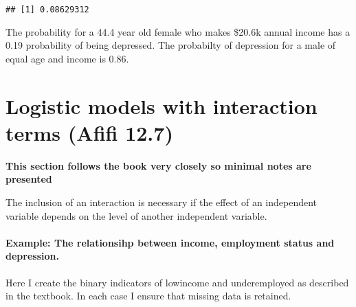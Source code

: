 \documentclass[]{article}
\newenvironment{Shaded}{\begin{snugshade}}{\end{snugshade}}
\newcommand{\KeywordTok}[1]{\textcolor[rgb]{0.13,0.29,0.53}{\textbf{{#1}}}}
\newcommand{\DataTypeTok}[1]{\textcolor[rgb]{0.13,0.29,0.53}{{#1}}}
\newcommand{\DecValTok}[1]{\textcolor[rgb]{0.00,0.00,0.81}{{#1}}}
\newcommand{\StringTok}[1]{\textcolor[rgb]{0.31,0.60,0.02}{{#1}}}
\newcommand{\OtherTok}[1]{\textcolor[rgb]{0.56,0.35,0.01}{{#1}}}
\newcommand{\NormalTok}[1]{{#1}}
\begin{document}
\begin{verbatim}
## [1] 0.08629312
\end{verbatim}

The probability for a 44.4 year old female who makes \$20.6k annual
income has a 0.19 probability of being depressed. The probabilty of
depression for a male of equal age and income is 0.86.

\section{Logistic models with interaction terms (Afifi
12.7)}\label{logistic-models-with-interaction-terms-afifi-12.7}

\textbf{This section follows the book very closely so minimal notes are
presented}

The inclusion of an interaction is necessary if the effect of an
independent variable depends on the level of another independent
variable.

\paragraph{Example: The relationsihp between income, employment status
and
depression.}\label{example-the-relationsihp-between-income-employment-status-and-depression.}

Here I create the binary indicators of lowincome and underemployed as
described in the textbook. In each case I ensure that missing data is
retained.

\begin{Shaded}
\end{Shaded}
\end{document}
